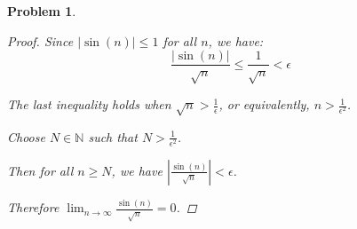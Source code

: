 \documentclass[12pt]{article}
\newtheorem{problem}{Problem}
\newcommand{\eps}{\ensuremath{\epsilon}}
\begin{document}
\begin{problem}
\begin{enumerate}
\begin{proof}
Since $|\sin(n)| \leq 1$ for all $n$, we have:
$$\frac{|\sin(n)|}{\sqrt{n}} \leq \frac{1}{\sqrt{n}} < \eps$$

The last inequality holds when $\sqrt{n} > \frac{1}{\eps}$, or equivalently, $n > \frac{1}{\eps^2}$.

Choose $N \in \mathbb{N}$ such that $N > \frac{1}{\eps^2}$.

Then for all $n \geq N$, we have $\left|\frac{\sin(n)}{\sqrt{n}}\right| < \eps$.

Therefore $\displaystyle \lim_{n\to\infty} \frac{\sin(n)}{\sqrt{n}} = 0$.
\end{proof}
\end{enumerate}
\end{problem}


\end{document}
